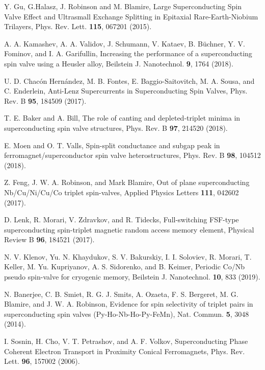 \documentclass[prb,amsmath,amssymb,reprint]{revtex4-2}
\begin{document}
\begin{thebibliography}{99}
 Y. Gu, G.Halasz, J. Robinson and M. Blamire,
Large Superconducting Spin Valve Effect and Ultrasmall Exchange Splitting in Epitaxial Rare-Earth-Niobium Trilayers,
Phys. Rev. Lett. \textbf{115}, 067201 (2015).

A. A. Kamashev, A. A. Validov, J. Schumann, V. Kataev, B. B\"{u}chner, Y. V. Fominov, and I. A. Garifullin, Increasing the performance of a superconducting spin valve using a Heusler alloy, Beilstein J.
Nanotechnol. \textbf{9}, 1764 (2018).


U. D. Chac\'{o}n Hern\'{a}ndez, M. B. Fontes, E. Baggio-Saitovitch, M. A. Sousa, and C.
Enderlein, Anti-Lenz Supercurrents in Superconducting Spin Valves, Phys. Rev. B \textbf{95}, 184509 (2017).

T. E. Baker and A. Bill,
The role of canting and depleted-triplet minima in superconducting spin valve structures,
Phys. Rev. B \textbf{97}, 214520 (2018).

E. Moen and O. T. Valls,
Spin-split conductance and subgap peak in ferromagnet/superconductor spin valve heterostructures,
 Phys. Rev. B \textbf{98}, 104512 (2018).

Z. Feng, J. W. A. Robinson, and Mark Blamire,
Out of plane superconducting Nb/Cu/Ni/Cu/Co triplet spin-valves,
 Applied Physics Letters \textbf{111}, 042602 (2017).

D. Lenk, R. Morari, V. Zdravkov, and R. Tidecks,
Full-switching FSF-type superconducting spin-triplet magnetic random access memory element,
 Physical Review B \textbf{96}, 184521 (2017).

N. V. Klenov, Yu. N. Khaydukov, S. V. Bakurskiy, I. I. Soloviev, R.
Morari, T. Keller, M. Yu. Kupriyanov, A. S. Sidorenko, and B. Keimer,
Periodic Co/Nb pseudo spin-valve for cryogenic memory, Beilstein J. Nanotechnol. \textbf{10}, 833 (2019).


 N. Banerjee, C. B. Smiet, R. G. J. Smits, A. Ozaeta,
F. S. Bergeret, M. G. Blamire, and J. W. A. Robinson,
Evidence for spin selectivity of triplet pairs in superconducting spin valves (Py-Ho-Nb-Ho-Py-FeMn),
Nat. Commun. \textbf{5}, 3048 (2014).

 I. Sosnin, H. Cho, V. T. Petrashov, and A. F. Volkov,
Superconducting Phase Coherent Electron Transport in Proximity Conical Ferromagnets,
Phys. Rev. Lett. \textbf{96}, 157002 (2006).


\end{thebibliography}
\end{document}
